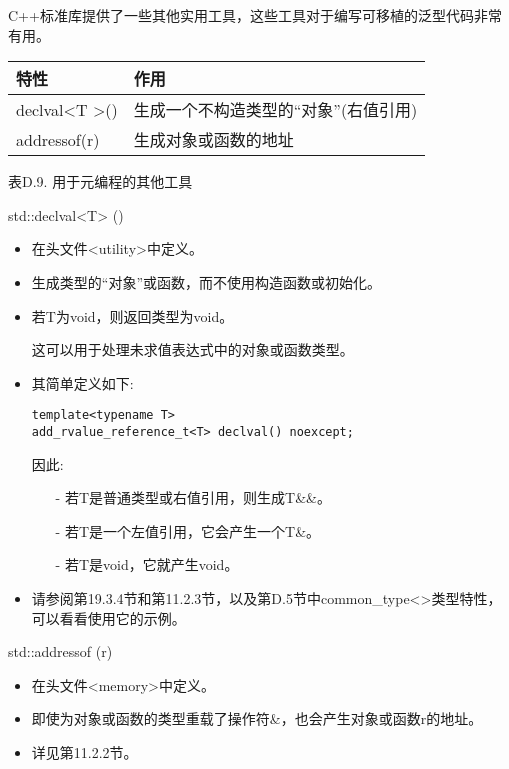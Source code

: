 

C++标准库提供了一些其他实用工具，这些工具对于编写可移植的泛型代码非常有用。

\begin{table}[H]
	\begin{center}
	\begin{tabular}{l|l}
		\hline
		\textbf{特性}                       & \textbf{作用}                                                         \\ \hline
		declval\textless{}T \textgreater{}() & 生成一个不构造类型的“对象”(右值引用) \\ \hline
		addressof(r)                         & 生成对象或函数的地址                             \\ \hline
	\end{tabular}
	\end{center}
\end{table}

\begin{center}
表D.9. 用于元编程的其他工具
\end{center}

std::declval<T> ()

\begin{itemize}
\item 
在头文件<utility>中定义。

\item 
生成类型的“对象”或函数，而不使用构造函数或初始化。

\item 
若T为void，则返回类型为void。

这可以用于处理未求值表达式中的对象或函数类型。

\item 
其简单定义如下:
\begin{lstlisting}[style=styleCXX]
template<typename T>
add_rvalue_reference_t<T> declval() noexcept;
\end{lstlisting}
因此:

\begin{itemize}
\item[-]
若T是普通类型或右值引用，则生成T\&\&。

\item[-]
若T是一个左值引用，它会产生一个T\&。

\item[-]
若T是void，它就产生void。
\end{itemize}

\item 
请参阅第19.3.4节和第11.2.3节，以及第D.5节中common\_type<>类型特性，可以看看使用它的示例。
\end{itemize}

std::addressof (r)

\begin{itemize}
\item
在头文件<memory>中定义。

\item
即使为对象或函数的类型重载了操作符\&，也会产生对象或函数r的地址。

\item
详见第11.2.2节。
\end{itemize}



















